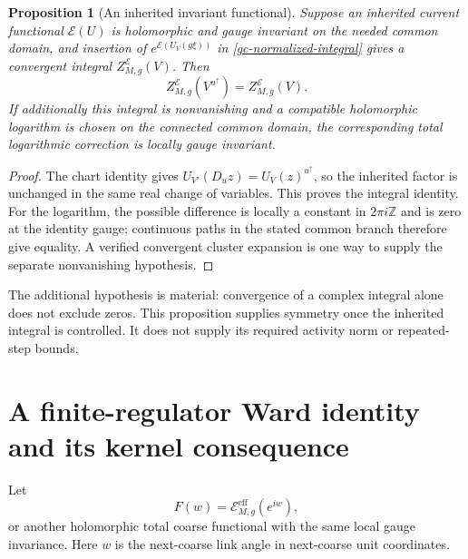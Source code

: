 \documentclass[11pt]{article}
\newtheorem{proposition}[theorem]{Proposition}
\theoremstyle{remark}
\begin{document}
\begin{proposition}[An inherited invariant functional]
\label{gc-inherited}
Suppose an inherited current functional $\mathcal E(U)$ is
holomorphic and gauge invariant on the needed common domain,
and insertion of $e^{\mathcal E(U_V(g\xi))}$ in
\eqref{gc-normalized-integral} gives a convergent integral
$Z_{M,g}^{\mathcal E}(V)$. Then
\begin{equation}\label{gc-inherited-integral}
 Z_{M,g}^{\mathcal E}(V^{u^\uparrow})
                          =Z_{M,g}^{\mathcal E}(V).
\end{equation}
If additionally this integral is nonvanishing and a compatible
holomorphic logarithm is chosen on the connected common domain,
the corresponding total logarithmic correction is locally
gauge invariant.
\end{proposition}
\begin{proof}
The chart identity gives
$U_{V'}(D_uz)=U_V(z)^{u^\uparrow}$, so the inherited factor is
unchanged in the same real change of variables. This proves
the integral identity. For the logarithm, the possible difference
is locally a constant in $2\pi i\mathbb Z$ and is zero at the
identity gauge; continuous paths in the stated common branch
therefore give equality. A verified convergent cluster expansion
is one way to supply the separate nonvanishing hypothesis.
\end{proof}
The additional hypothesis is material: convergence of a complex
integral alone does not exclude zeros. This proposition supplies
symmetry once the inherited integral is controlled. It does not
supply its required activity norm or repeated-step bounds.

\section{A finite-regulator Ward identity and its kernel consequence}
\label{gc-ward-section}

Let
\begin{equation}\label{gc-f}
 F(w)=\mathcal E_{M,g}^{\mathrm{eff}}(e^{iw}),
\end{equation}
or another holomorphic total coarse functional with the same
local gauge invariance. Here $w$ is the next-coarse link angle
in next-coarse unit coordinates.
\end{document}
